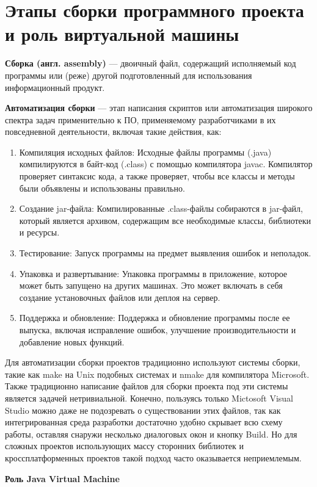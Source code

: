 \section{Этапы сборки программного проекта и роль виртуальной машины}

\textbf{Сборка (англ. assembly)} — двоичный файл, содержащий исполняемый код программы или (реже) другой подготовленный для использования информационный продукт.

\textbf{Автоматизация сборки} — этап написания скриптов или автоматизация широкого спектра задач применительно к ПО, применяемому разработчиками в их повседневной деятельности, включая такие действия, как:
\begin{enumerate}
\item Компиляция исходных файлов: Исходные файлы программы (.java) компилируются в байт-код (.class) с помощью компилятора javac. Компилятор проверяет синтаксис кода, а также проверяет, чтобы все классы и методы были объявлены и использованы правильно.
\item Создание jar-файла: Компилированные .class-файлы собираются в jar-файл, который является архивом, содержащим все необходимые классы, библиотеки и ресурсы.
\item Тестирование: Запуск программы на предмет выявления ошибок и неполадок.
\item Упаковка и развертывание: Упаковка программы в приложение, которое может быть запущено на других машинах. Это может включать в себя создание установочных файлов или деплоя на сервер.
\item Поддержка и обновление: Поддержка и обновление программы после ее выпуска, включая исправление ошибок, улучшение производительности и добавление новых функций.
\end{enumerate}

Для автоматизации сборки проектов традиционно используют системы сборки, такие как make на Unix подобных системах и nmake для компилятора Microsoft. Также традиционно написание файлов для сборки проекта под эти системы является задачей нетривиальной. Конечно, пользуясь только Mictosoft Visual Studio можно даже не подозревать о существовании этих файлов, так как интегрированная среда разработки достаточно удобно скрывает всю схему работы, оставляя снаружи несколько диалоговых окон и кнопку Build. Но для сложных проектов использующих массу сторонних библиотек и кроссплатформенных проектов такой подход часто оказывается неприемлемым.

\textbf{Роль Java Virtual Machine}

